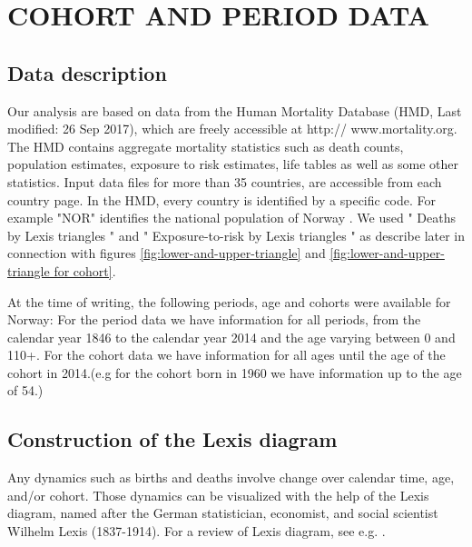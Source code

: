 
\chapter{COHORT AND PERIOD DATA} 
\label{sec:third}
\section{Data description}

Our analysis are based on data from the Human Mortality Database (HMD, Last modified: 26 Sep 2017), which are freely accessible at http:// www.mortality.org. 
The HMD contains aggregate mortality statistics such as death counts, population estimates, exposure to risk estimates, life tables as well as some other statistics. 
Input data files for more than 35 countries, are accessible from each country page. In the HMD, every country is identified by a specific code.
For example "NOR" identifies the national population of Norway .
We used " Deaths by Lexis triangles " and " Exposure-to-risk by Lexis triangles " as describe later in connection with figures \ref{fig:lower-and-upper-triangle} and \ref{fig:lower-and-upper-triangle for cohort}.

At the time of writing, the following periods, age  and cohorts were available for Norway:
For the period data we have information for all periods, from the calendar year 1846 to the calendar year 2014 and the age varying between 0 and 110+.
For the cohort data we have information for all ages until the age of the cohort in 2014.(e.g for the cohort born in 1960 we have information up to the age of 54.)



\section{Construction of the Lexis diagram}
    
Any dynamics such as births and deaths involve change over calendar time, age, and/or cohort. Those dynamics can be visualized with the help of the Lexis diagram, named after the German statistician, economist, and social scientist Wilhelm Lexis (1837-1914). For a review of Lexis diagram, see e.g. \textcite{C06}.

